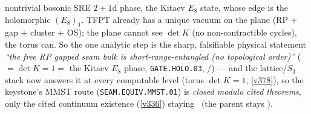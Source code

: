 \documentclass[11pt,a4paper]{article}
\begin{document}
\begin{keybox}
nontrivial bosonic SRE $2{+}1$d phase, the Kitaev $E_8$ state, whose edge is the holomorphic $(E_8)_1$. TFPT
already has a unique vacuum on the plane (RP $+$ gap $+$ cluster $+$ OS); the plane cannot see $\det K$ (no
non-contractible cycles), the torus can. So the one analytic step is the sharp, falsifiable physical
statement \emph{``the free RP gapped seam bulk is short-range-entangled (no topological order)''}
($=\det K=1=$ the Kitaev $E_8$ phase, \texttt{GATE.HOLO.03}, \mE/\mC) --- and the lattice/$S_3$ stack now answers
it at every computable level (torus $\det K{=}1$, \vref{v378}), so the keystone's MMST route
(\texttt{SEAM.EQUIV.MMST.01}) is \emph{closed modulo cited
theorems}, only the cited continuum existence (\vref{v336}) staying \mO\ (the parent stays \mO).
\end{keybox}
\end{document}
